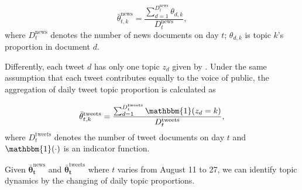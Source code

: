 \begin{equation}
\bar{\theta}_{t,k}^{\mathrm{news}}=\frac{\sum_{d=1}^{D_t^{\mathrm{news}}} \theta_{d,k}}{D_t^{\mathrm{news}}},
\end{equation}
where $D_t^{\mathrm{news}}$ denotes the number of news documents on day $t$; $\theta_{d,k}$ is topic $k$'s proportion in document $d$.

Differently, each tweet $d$ has only one topic $z_d$ given by \stlda. Under the same assumption that each tweet contributes equally to the voice of public, the aggregation of daily tweet topic proportion is calculated as

\begin{equation}
\bar{\theta}_{t,k}^{\mathrm{tweets}} = \frac{\sum_{d=1}^{D_t^{\mathrm{tweets}}} \mathbbm{1}(z_d=k)}{D_t^{\mathrm{tweets}}},
\end{equation}
where $D_t^{\mathrm{tweets}}$ denotes the number of tweet documents on day $t$ and $\mathbbm{1}(\cdot)$ is an indicator function.

Given $\bm{\bar{\theta}_t^{\mathrm{news}}}$ and $\bm{\bar{\theta}_t^{\mathrm{tweets}}}$ where $t$ varies from August 11 to 27, we can identify topic dynamics by the changing of daily topic proportions.